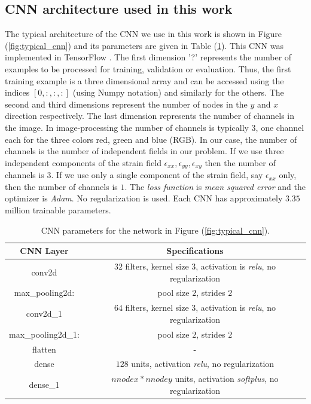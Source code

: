 \documentclass[12pt]{article}
\begin{document}
\subsection{\label{sect:cnnarch} CNN architecture used in this work}
The typical architecture of the CNN we use in this work is shown in Figure (\ref{fig:typical_cnn}) and its parameters are given in Table (\ref{tab:cnnparams}). This CNN was implemented in TensorFlow \cite{misc:tensorflow}. The first dimension '?' represents the number of examples to be processed for training, validation or evaluation. Thus, the first training example is a three dimensional array and can be accessed using the indices $[0,:,:,:]$ (using Numpy notation) and similarly for the others. The second and third dimensions represent the number of nodes in the $y$ and $x$ direction respectively. The last dimension represents the number of channels in the image. In image-processing the number of channels is typically $3$, one channel each for the three colors red, green and blue (RGB). In our case, the number of channels is the number of independent fields in our problem. If we use three independent components of the strain field $\epsilon_{xx},\epsilon_{yy},\epsilon_{xy}$ then the number of channels is $3$. If we use only a single component of the strain field, say $\epsilon_{xx}$ only, then the number of channels is $1$. The \textit{loss function} is \textit{mean squared error} and the optimizer is \textit{Adam}. No regularization is used.  Each CNN has approximately $3.35$ million trainable parameters.
\begin{table}
  \centering
 \begin{tabular}{|c|c|}
   \hline
   CNN Layer & Specifications \\
   \hline
   conv2d    & $32$ filters, kernel size $3$, activation is \textit{relu}, no regularization\\
   \hline
   max\_pooling2d: & pool size $2$, strides $2$\\
   \hline
   conv2d\_1 & $64$ filters, kernel size $3$, activation is \textit{relu}, no regularization\\
   \hline
   max\_pooling2d\_1: & pool size $2$, strides $2$\\
   \hline
   flatten & -\\
   \hline
   dense   & $128$ units, activation \textit{relu}, no regularization\\
   \hline
   dense\_1 & $nnodex*nnodey$ units, activation \textit{softplus}, no regularization\\
   \hline
 \end{tabular}
 \caption{\label{tab:cnnparams} CNN parameters for the network in Figure (\ref{fig:typical_cnn}).}
\end{table}
\end{document}
